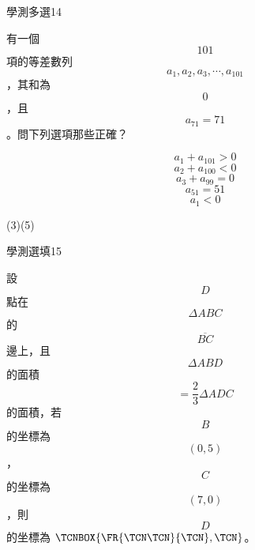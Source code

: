 \begin{QUESTIONS}
\begin{QUESTION}
\begin{ExamInfo}{85}{學測}{多選}{14}
        \end{ExamInfo}
        \begin{ExamAnsRateInfo}{}{}{}{}
        \end{ExamAnsRateInfo}
        \begin{QBODY}
            有一個\[101\]項的等差數列\[{{a}_{1}},{{a}_{2}},{{a}_{3}},\cdots ,{{a}_{101}}\]，其和為\[0\]，且\[{{a}_{71}}=71\]。問下列選項那些正確？
            \begin{QOPS} 
 \QOP\[{{a}_{1}}+{{a}_{101}}>0\]
            \QOP\[{{a}_{2}}+{{a}_{100}}<0\]
            \QOP\[{{a}_{3}}+{{a}_{99}}=0\]
            \QOP\[{{a}_{51}}=51\]
            \QOP\[{{a}_{1}}<0\]
            \end{QOPS}            
        \end{QBODY}
        \begin{QFROMS}
        \end{QFROMS}
        \begin{QTAGS}\end{QTAGS}
        \begin{QANS}
            (3)(5)
        \end{QANS}
        \begin{QSOLLIST}
        \end{QSOLLIST}
        \begin{QEMPTYSPACE}
        \end{QEMPTYSPACE}
    \end{QUESTION}
\end{QUESTIONS}\begin{QUESTIONS}
    \begin{QUESTION}
        \begin{ExamInfo}{85}{學測}{選填}{15}
        \end{ExamInfo}
        \begin{ExamAnsRateInfo}{}{}{}{}
        \end{ExamAnsRateInfo}
        \begin{QBODY}
            設\[D\]點在\[\Delta ABC\]的\[\overline{BC}\]邊上，且\[\Delta ABD\]的面積\[=\frac{2}{3}\Delta ADC\]的面積，若\[B\]的坐標為\[\left( 0,5 \right)\]，\[C\]的坐標為\[\left( 7,0 \right)\]，則\[D\]的坐標為 $\TCNBOX{\FR{\TCN\TCN}{\TCN}, \TCN}$。
        \end{QBODY}
        \begin{QFROMS}
        \end{QFROMS}
        \begin{QTAGS}\end{QTAGS}
        \begin{QANS}

\end{QANS}
\end{QUESTION}
\end{QUESTIONS}
